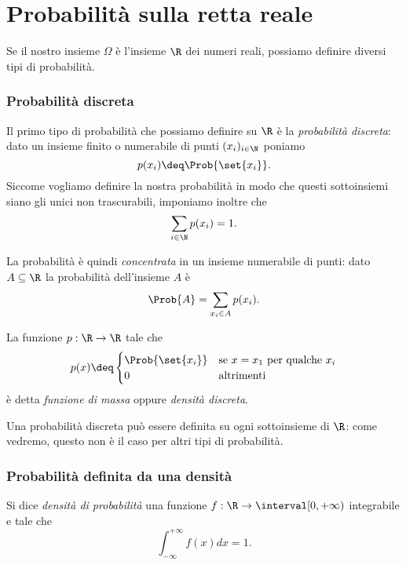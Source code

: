 \section{Probabilità sulla retta reale}

Se il nostro insieme $\Omega$ è l'insieme $\R$ dei numeri reali, possiamo definire diversi tipi di probabilità.

\subsubsection{Probabilità discreta}
Il primo tipo di probabilità che possiamo definire su $\R$ è la \emph{probabilità discreta}: dato un insieme finito o numerabile di punti $(x_i)_{i \in \N}$ poniamo \[
    p(x_i) \deq \Prob{\set{x_i}}.    
\] Siccome vogliamo definire la nostra probabilità in modo che questi sottoinsiemi siano gli unici non trascurabili, imponiamo inoltre che \[
    \sum_{i \in \N} p(x_i) = 1.    
\] 

La probabilità è quindi \emph{concentrata} in un insieme numerabile di punti: dato $A \subseteq \R$ la probabilità dell'insieme $A$ è \[
    \Prob{A} = \sum_{x_i \in A} p(x_i).    
\]

\begin{definition}
    La funzione $p : \R \to \R$ tale che \[
        p(x) \deq \begin{cases}
            \Prob{\set{x_i}} &\text{se } x = x_1 \text{ per qualche } x_i\\
            0 &\text{altrimenti}
        \end{cases}    
    \]  è detta \emph{funzione di massa} oppure \emph{densità discreta}.
\end{definition}

\begin{remark}
    Una probabilità discreta può essere definita su ogni sottoinsieme di $\R$: come vedremo, questo non è il caso per altri tipi di probabilità.
\end{remark}

\subsubsection{Probabilità definita da una densità}

\begin{definition}
    Si dice \emph{densità di probabilità} una funzione $f : \R \to \interval[{0, +\infty})$ integrabile e tale che \[
        \int_{-\infty}^{+\infty} f(x)dx = 1.    
    \]
\end{definition}

